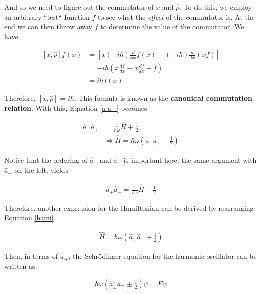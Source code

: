 And so we need to figure out the commutator of $x$ and $\hat{p}$. To do this,
we employ an arbitrary ``test`` function $f$ to see what the \textit{effect} of
the commutator is. At the end we can then throw away $f$ to determine the value
of the commutator. We have 

\begin{align} \label{}
  [x, \hat{p}] f(x) &= \left[ x(-i\hbar) \frac{d }{d x} f(x) - (-i\hbar) \frac{d
  }{d x} (xf) \right] \\ &= -i\hbar \left( x \frac{d f}{d x} - x \frac{d f}{d x}
- f\right) \\ &= i\hbar f(x)
\end{align}\vspace{3px}   

Therefore, $[x, \hat{p}] = i\hbar$. This formula is known as the \textbf{canonical
commutation relation}. With this, Equation \ref{a-a+} becomes 

\begin{align} \label{}
  \hat{a}_- \hat{a}_+ &= \frac{1}{\hbar \omega} \hat{H} + \frac{1}{2}  \\
                      &\Rightarrow \hat{H} = \hbar \omega \left( \hat{a}_-
                      \hat{a}_+ - \frac{1}{2} \right)      
\end{align}\vspace{3px}

Notice that the ordering of $\hat{a}_+$ and $\hat{a}_-$ is important here; the
same argument with $\hat{a}_+$ on the left, yields 

\begin{align} \label{hami}
  \hat{a}_+ \hat{a}_- = \frac{1}{\hbar \omega} \hat{H} - \frac{1}{2}
\end{align}\vspace{3px}   

Therefore, another expression for the Hamiltonian can be derived by rearranging
Equation \ref{hami}. 

\begin{align} \label{}
  \hat{H} = \hbar \omega \left(\hat{a}_+ \hat{a}_- + \frac{1}{2}\right)
\end{align}\vspace{3px}


Then, in terms of $\hat{a}_\pm$, the Schr\"odinger equation for the harmonic
oscillator can be written as 

\begin{align} \label{intermsof}
  \hbar\omega \left( \hat{a}_\pm \hat{a}_\mp \pm \frac{1}{2} \right) \psi = E\psi 
\end{align}\vspace{3px}

